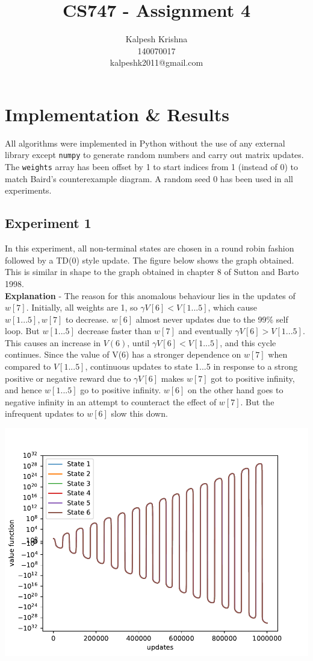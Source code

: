 \documentclass[11pt]{article}
\title{\textbf{CS747 - Assignment 4}}
\author{Kalpesh Krishna\\140070017\\kalpeshk2011@gmail.com}
\date{}
\begin{document}
\maketitle

\section{Implementation \& Results}
All algorithms were implemented in Python without the use of any external library except \texttt{numpy} to generate random numbers and carry out matrix updates. The \texttt{weights} array has been offset by 1 to start indices from 1 (instead of 0) to match Baird's counterexample diagram. A random seed 0 has been used in all experiments.
\subsection{Experiment 1}
In this experiment, all non-terminal states are chosen in a round robin fashion followed by a TD($0$) style update. The figure below shows the graph obtained. This is similar in shape to the graph obtained in chapter 8 of Sutton and Barto 1998.\\
\textbf{Explanation} - The reason for this anomalous behaviour lies in the updates of $w[7]$. Initially, all weights are 1, so $\gamma V[6] < V[1...5]$, which cause $w[1...5], w[7]$ to decrease. $w[6]$ almost never updates due to the 99\% self loop. But $w[1...5]$ decrease faster than $w[7]$ and eventually $\gamma V[6] > V[1...5]$. This causes an increase in $V(6)$, until $\gamma V[6] < V[1...5]$, and this cycle continues. Since the value of V(6) has a stronger dependence on $w[7]$ when compared to $V[1...5]$, continuous updates to state 1...5 in response to a strong positive or negative reward due to $\gamma V[6]$ makes $w[7]$ got to positive infinity, and hence $w[1...5]$ go to positive infinity. $w[6]$ on the other hand goes to negative infinity in an attempt to counteract the effect of $w[7]$. But the infrequent updates to $w[6]$ slow this down.
\begin{center}
\includegraphics[width=15cm]{expt1.pdf}
\end{center}
\end{document}
